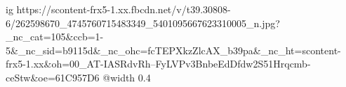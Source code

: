  
 
 
 
 

\ifcmt
  ig https://scontent-frx5-1.xx.fbcdn.net/v/t39.30808-6/262598670_4745760715483349_5401095667623310005_n.jpg?_nc_cat=105&ccb=1-5&_nc_sid=b9115d&_nc_ohc=fcTEPXkzZlcAX_b39pa&_nc_ht=scontent-frx5-1.xx&oh=00_AT-IASRdvRh--FyLVPv3BnbeEdDfdw2S51Hrqcmb-ceStw&oe=61C957D6
  @width 0.4
\fi
